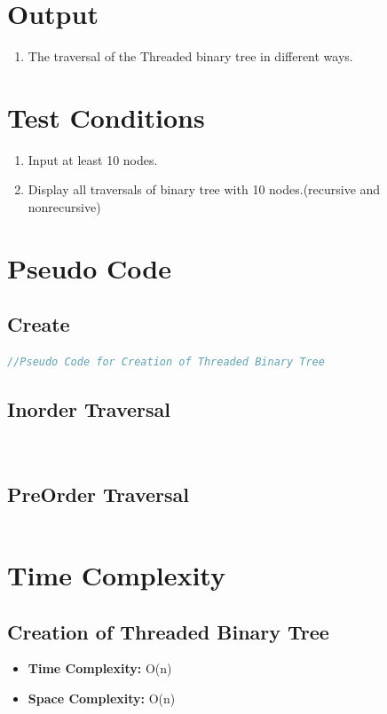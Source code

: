 \documentclass[11pt]{article}
\begin{document}
\section{Output}
\begin{enumerate}
    \item The traversal of the Threaded binary tree in different ways.
\end{enumerate}

\section{Test Conditions}
\begin{enumerate}
    \item Input at least 10 nodes.
    \item Display all traversals of binary tree with 10 nodes.(recursive and nonrecursive)
\end{enumerate}

\section{Pseudo Code}
\subsection{Create}
\begin{lstlisting}[language=C++]
	//Pseudo Code for Creation of Threaded Binary Tree

\end{lstlisting}
\subsection{Inorder Traversal}
\begin{lstlisting}[language=C++]
    
\end{lstlisting}
\subsection{PreOrder Traversal}
\begin{lstlisting}[language=C++]
\end{lstlisting}

\section{Time Complexity}

\subsection{Creation of Threaded Binary Tree}
\begin{itemize}
    \item \textbf{Time Complexity:} O(n)
    \item \textbf{Space Complexity:} O(n)
\end{itemize}
\end{document}
